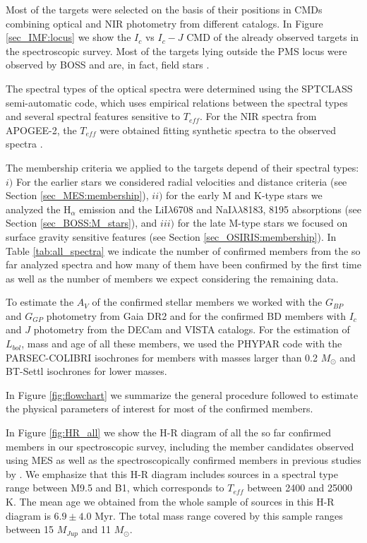 \documentclass[12pt]{article}
\begin{document}
Most of the targets were selected on the basis of their positions in CMDs combining optical and NIR photometry from different catalogs. In Figure \ref{sec_IMF:locus} we show the $I_c$ vs $I_c-J$ CMD of the already observed targets in the spectroscopic survey. Most of the targets lying outside the PMS locus were observed by BOSS \citep{Alam2015} and are, in fact, field stars \citep{Suarez2017}.

The spectral types of the optical spectra were determined using the SPTCLASS semi-automatic code, which uses empirical relations between the spectral types and several spectral features sensitive to $T_{eff}$. For the NIR spectra from APOGEE-2, the $T_{eff}$ were obtained fitting synthetic spectra to the observed spectra \citep{Kounkel2018}.

The membership criteria we applied to the targets depend of their spectral types: $i)$ For the earlier stars we considered radial velocities and distance criteria (see Section \ref{sec_MES:membership}), $ii)$ for the early M and K-type stars we analyzed the H$_\alpha$ emission and the LiI$\lambda$6708 and NaI$\lambda\lambda$8183, 8195 absorptions (see Section \ref{sec_BOSS:M_stars}), and $iii)$ for the late M-type stars we focused on surface gravity sensitive features (see Section \ref{sec_OSIRIS:membership}). In Table \ref{tab:all_spectra} we indicate the number of confirmed members from the so far analyzed spectra and how many of them have been confirmed by the first time as well as the number of members we expect considering the remaining data.

To estimate the $A_V$ of the confirmed stellar members we worked with the $G_{BP}$ and $G_{GP}$ photometry from Gaia DR2 and for the confirmed BD members with $I_c$ and $J$ photometry from the DECam and VISTA catalogs. For the estimation of $L_{bol}$, mass and age of all these members, we used the PHYPAR code with the PARSEC-COLIBRI isochrones for members with masses larger than 0.2 $M_\odot$ and BT-Settl isochrones for lower masses. 

In Figure \ref{fig:flowchart} we summarize the general procedure followed to estimate the physical parameters of interest for most of the confirmed members. 

In Figure \ref{fig:HR_all} we show the H-R diagram of all the so far confirmed members in our spectroscopic survey, including the member candidates observed using MES as well as the spectroscopically confirmed members in previous studies by \citet{Briceno2005,Briceno2007,Downes2014,Downes2015,Briceno2018}. We emphasize that this H-R diagram includes sources in a spectral type range between M9.5 and B1, which corresponds to $T_{eff}$ between 2400 and 25000 K. The mean age we obtained from the whole sample of sources in this H-R diagram is $6.9\pm4.0$ Myr. The total mass range covered by this sample ranges between 15 $M_{Jup}$ and 11 $M_\odot$.
\end{document}
